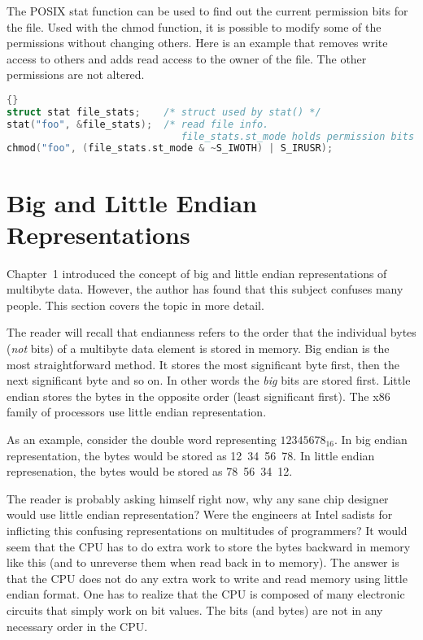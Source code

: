 The POSIX {\code stat} function can be used to find out the current 
permission bits for the file. Used with the {\code chmod} function, it
is possible to modify some of the permissions without changing others.
Here is an example that removes write access to others and adds read
access to the owner of the file. The other permissions are not altered.
\begin{lstlisting}[language=C]{}
struct stat file_stats;    /* struct used by stat() */
stat("foo", &file_stats);  /* read file info. 
                              file_stats.st_mode holds permission bits */
chmod("foo", (file_stats.st_mode & ~S_IWOTH) | S_IRUSR);
\end{lstlisting}

\section{Big and Little Endian Representations}

Chapter~1 introduced the concept of big and little endian
representations of multibyte data. However, the author has found
that this subject confuses many people. This section covers the
topic in more detail. 

The reader will recall that endianness refers to the order that the
individual bytes (\emph{not} bits) of a multibyte data element is
stored in memory. Big endian is the most straightforward method. It
stores the most significant byte first, then the next significant byte
and so on. In other words the \emph{big} bits are stored first. Little
endian stores the bytes in the opposite order (least significant first).
The x86 family of processors use little endian representation.

As an example, consider the double word representing $12345678_{16}$. In
big endian representation, the bytes would be stored as 12~34~56~78. In
little endian represenation, the bytes would be stored as 78~56~34~12.

The reader is probably asking himself right now, why any sane chip
designer would use little endian representation? Were the engineers at
Intel sadists for inflicting this confusing representations on
multitudes of programmers? It would seem that the CPU has to do extra
work to store the bytes backward in memory like this (and to unreverse
them when read back in to memory). The answer is that the CPU does not
do any extra work to write and read memory using little endian format.
One has to realize that the CPU is composed of many electronic
circuits that simply work on bit values. The bits (and bytes) are not
in any necessary order in the CPU.

